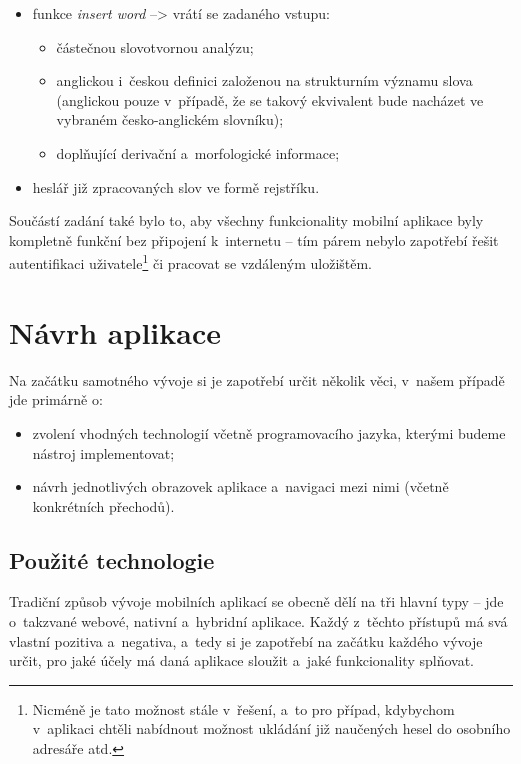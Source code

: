\begin{itemize}
\tightlist
\item
  funkce \emph{insert word} --\textgreater{} vrátí se zadaného vstupu:

  \begin{itemize}
  \tightlist
  \item
    částečnou slovotvornou analýzu;
  \item
    anglickou i~českou definici založenou na strukturním významu slova
    (anglickou pouze v~případě, že se takový ekvivalent bude nacházet ve
    vybraném česko-anglickém slovníku);
  \item
    doplňující derivační a~morfologické informace;
  \end{itemize}
\item
  heslář již zpracovaných slov ve formě rejstříku.
\end{itemize}

Součástí zadání také bylo to, aby všechny funkcionality mobilní aplikace
byly kompletně funkční bez připojení k~internetu -- tím párem nebylo
zapotřebí řešit autentifikaci
uživatele\footnote{Nicméně je tato možnost stále v~řešení, a~to pro případ, kdybychom v~aplikaci chtěli nabídnout možnost ukládání již naučených hesel do osobního adresáře atd.}
či pracovat se vzdáleným uložištěm.

\hypertarget{nuxe1vrh-aplikace}{%
\section{Návrh aplikace}\label{nuxe1vrh-aplikace}}

Na začátku samotného vývoje si je zapotřebí určit několik věci, v~našem
případě jde primárně o:

\begin{itemize}
\tightlist
\item
  zvolení vhodných technologií včetně programovacího jazyka, kterými
  budeme nástroj implementovat;
\item
  návrh jednotlivých obrazovek aplikace a~navigaci mezi nimi (včetně
  konkrétních přechodů).
\end{itemize}

\hypertarget{pouux17eituxe9-technologie}{%
\subsection{Použité technologie}\label{pouux17eituxe9-technologie}}

Tradiční způsob vývoje mobilních aplikací se obecně dělí na tři hlavní
typy -- jde o~takzvané webové, nativní a~hybridní aplikace. Každý
z~těchto přístupů má svá vlastní pozitiva a~negativa, a~tedy si je
zapotřebí na začátku každého vývoje určit, pro jaké účely má daná
aplikace sloužit a~jaké funkcionality splňovat.

